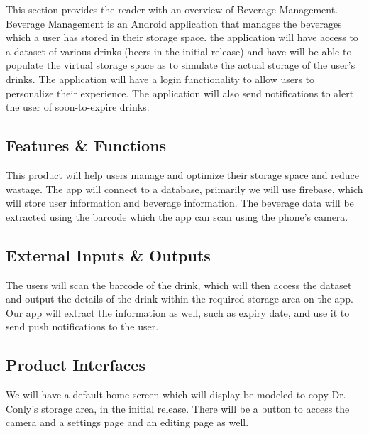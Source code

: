 This section provides the reader with an overview of Beverage Management. Beverage Management is an Android 
application that manages the beverages which a user has stored in their storage space. the application will have access
to a dataset of various drinks (beers in the initial release) and have will be able to populate the virtual storage 
space as to simulate the actual storage of the user's drinks. The application will have a login functionality to allow 
users to personalize their experience. The application will also send notifications to alert the user of 
soon-to-expire drinks.

\subsection{Features \& Functions}
This product will help users manage and optimize their storage space and reduce wastage. The app will connect to a database,
primarily we will use firebase, which will store user information and beverage information. The beverage data will be extracted
using the barcode which the app can scan using the phone's camera.

\subsection{External Inputs \& Outputs}
The users will scan the barcode of the drink, which will then access the dataset and output the details of the drink within the required storage area on the app.
Our app will extract the information as well, such as expiry date, and use it to send push notifications to the user.

\subsection{Product Interfaces}
We will have a default home screen which will display be modeled to copy Dr. Conly's storage area, in the initial release. There 
will be a button to access the camera and a settings page and an editing page as well.
